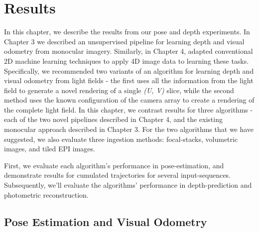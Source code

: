 

\chapter{Results}

In this chapter, we describe the results from our pose and depth experiments. In Chapter 3 we described an unsupervised pipeline for learning depth and visual odometry from monocular imagery. Similarly, in Chapter 4, adapted conventional 2D machine learning techniques to apply 4D image data to learning these tasks. Specifically, we recommended two variants of an algorithm for learning depth and visual odometry from light fields - the first uses all the information from the light field to generate a novel rendering of a single \textit{(U, V)} slice, while the second method uses the known configuration of the camera array to create a rendering of the complete light field. In this chapter, we contrast results for three algorithms - each of the two novel pipelines described in Chapter 4, and the existing monocular approach described in Chapter 3. For the two algorithms that we have suggested, we also evaluate three ingestion methods: focal-stacks, volumetric images, and tiled EPI images. 

First, we evaluate each algorithm's performance in pose-estimation, and demonstrate results for cumulated trajectories for several input-sequences. Subsequently, we'll evaluate the algorithms' performance in depth-prediction and photometric reconstruction. 

\section{Pose Estimation and Visual Odometry}

